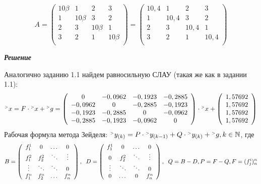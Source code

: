 \documentclass[12pt]{article}
\begin{document}
\begin{equation*}
	A = \left(
	\begin{array}{cccc}
		10\beta & 1 & 2 & 3\\
		1 & 10\beta & 3 & 2\\
		2 & 3 & 10\beta & 1\\
		3 & 2 & 1 & 10\beta\\
	\end{array}
	\right)
	=
	\left(
	\begin{array}{cccc}
		10,4 & 1 & 2 & 3\\
		1 & 10,4 & 3 & 2\\
		2 & 3 & 10,4 & 1\\
		3 & 2 & 1 & 10,4\\
	\end{array}
	\right)
\end{equation*}
\begin{center}
	\textbf{\textit{Решение}}
\end{center}
Аналогично заданию 1.1 найдем равносильную СЛАУ (такая же как в задании 1.1):
\begin{equation*}
	{}^{\mathsmaller{>}} x = F \cdot {}^{\mathsmaller{>}} x + {}^{\mathsmaller{>}} g = \left(
	\begin{array}{cccc}
		0 & -0,0962 & -0,1923 & -0,2885 \\
		-0,0962 & 0 & -0,2885 & -0,1923 \\
		-0,1923 & -0,2885 & 0 & -0,0962 \\
		-0,2885 & -0,1923 & -0,0962 & 0 \\
	\end{array}
	\right) \cdot {}^{\mathsmaller{>}} x + \left(
	\begin{array}{c}
		1,57692 \\ 1,57692 \\ 1,57692 \\ 1,57692 \\ 
	\end{array}\right)
\end{equation*}
Рабочая формула метода Зейделя: $ {}^{\mathsmaller{>}} y_{(k)} = P\cdot 
{}^{\mathsmaller{>}} y_{(k-1)} + Q \cdot {}^{\mathsmaller{>}} y_{(k)} +
{}^{\mathsmaller{>}} g, k \in \mathbb{N} $,
где
\begin{equation*}
	 B = \left(
\begin{array}{cccc}
	f^1_1 & 0 & \dots & 0 \\
	f^2_1 & f^2_2 & \ddots & \vdots \\
	\vdots & \ddots & \ddots & 0 \\
	f^n_1 & f^n_2 & \dots & f^n_n \\
\end{array}
\right), \hspace{0.2cm}
D = \left(
\begin{array}{cccc}
	f^1_1 & 0 & \dots & 0 \\
	0 & f^2_2 & \ddots & \vdots \\
	\vdots & \ddots & \ddots & 0 \\
	0 & \dots & 0 & f^n_n \\
\end{array}
\right), \hspace{0.2cm}
Q = B - D, P = F-Q, F = (f^i_j)^n_n
\end{equation*}
\end{document}
